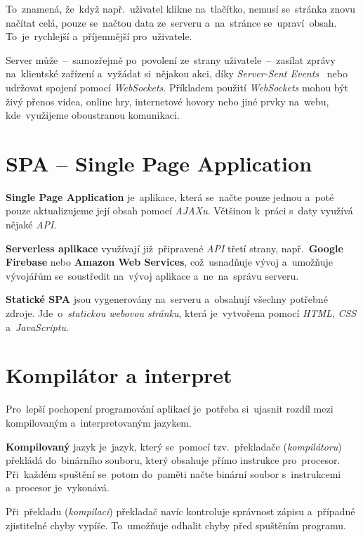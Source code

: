 \documentclass[11pt,a4paper]{report}
\begin{document}
            To~znamená, že~když např.~uživatel klikne na~tlačítko, nemusí se~stránka znovu načítat celá, pouze se~načtou data ze~serveru a~na~stránce se~upraví~obsah. To~je~rychlejší a~příjemnější pro~uživatele.

            Server může~--~samozřejmě po~povolení ze~strany uživatele~--~zasílat zprávy na~klientské zařízení a~vyžádat si~nějakou akci, díky \emph{Server-Sent Events}~\cite{sse:mdn} nebo udržovat spojení pomocí \emph{WebSockets}. Příkladem použití \emph{WebSockets} mohou být živý přenos videa, online hry, internetové hovory nebo jiné prvky na~webu, kde~využijeme oboustranou komunikaci.~\cite{websocket:mdn}

        \section{SPA -- Single Page Application}
            \textbf{Single Page Application} je~aplikace, která se~načte pouze jednou a~poté pouze aktualizujeme její obsah pomocí \emph{AJAXu}. Většinou k~práci s~daty využívá nějaké \emph{API}.

            \textbf{Serverless aplikace} využívají již~připravené \emph{API} třetí strany, např.~\textbf{Google Firebase} nebo \textbf{Amazon Web Services}, což~usnadňuje vývoj a~umožňuje vývojářům se~soustředit na~vývoj aplikace a~ne~na~správu serveru.
            
            \textbf{Statické SPA} jsou vygenerovány na~serveru a~obsahují všechny potřebné zdroje. Jde~o~\emph{statickou webovou stránku}, která je~vytvořena pomocí \emph{HTML}, \emph{CSS} a~\emph{JavaScriptu}.
        
        \section{Kompilátor a interpret}
            Pro~lepší pochopení programování aplikací je~potřeba si~ujasnit rozdíl mezi kompilovaným a~interpretovaným jazykem.

            \textbf{Kompilovaný} jazyk je~jazyk, který se~pomocí tzv.~překladače (\emph{kompilátoru}) překládá do~binárního souboru, který obsahuje přímo instrukce pro~procesor. Při~každém spuštění se~potom do~paměti načte binární soubor s~instrukcemi a~procesor je~vykonává.
            
            Při~překladu (\emph{kompilaci}) překladač navíc kontroluje správnost zápisu a~případné zjistitelné chyby vypíše. To~umožňuje odhalit chyby před spuštěním programu.
\end{document}

